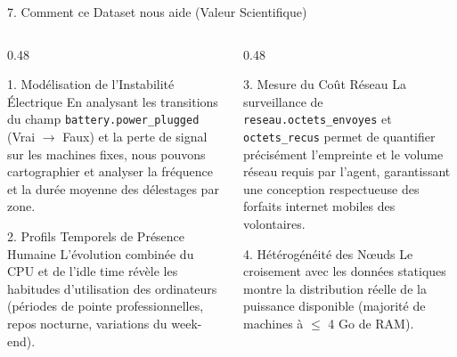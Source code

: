 \documentclass[10pt,aspectratio=169]{beamer}
\begin{document}
\begin{frame}{7. Comment ce Dataset nous aide (Valeur Scientifique)}
  \begin{columns}[T]
    \begin{column}{0.48\textwidth}
      \begin{block}{1. Modélisation de l'Instabilité Électrique}
        En analysant les transitions du champ \texttt{battery.power\_plugged} (Vrai $\rightarrow$ Faux) et la perte de signal sur les machines fixes, nous pouvons cartographier et analyser la fréquence et la durée moyenne des délestages par zone.
      \end{block}
      
      \begin{block}{2. Profils Temporels de Présence Humaine}
        L'évolution combinée du CPU et de l'idle time révèle les habitudes d'utilisation des ordinateurs (périodes de pointe professionnelles, repos nocturne, variations du week-end).
      \end{block}
    \end{column}
    
    \begin{column}{0.48\textwidth}
      \begin{block}{3. Mesure du Coût Réseau}
        La surveillance de \texttt{reseau.octets\_envoyes} et \texttt{octets\_recus} permet de quantifier précisément l'empreinte et le volume réseau requis par l'agent, garantissant une conception respectueuse des forfaits internet mobiles des volontaires.
      \end{block}
      
      \begin{block}{4. Hétérogénéité des Nœuds}
        Le croisement avec les données statiques montre la distribution réelle de la puissance disponible (majorité de machines à $\le$ 4 Go de RAM).
      \end{block}
    \end{column}
  \end{columns}
\end{frame}
\end{document}
